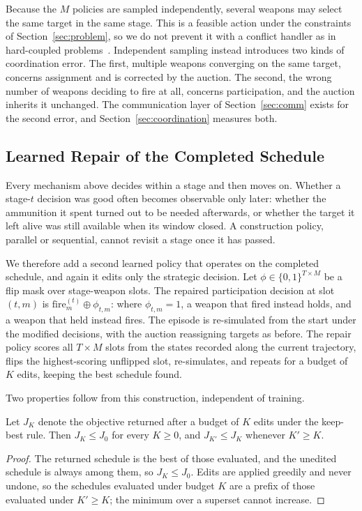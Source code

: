 Because the $M$ policies are sampled independently, several weapons may select the same target in the same stage. This is a feasible action under the constraints of Section~\ref{sec:problem}, so we do not prevent it with a conflict handler as in hard-coupled problems~\cite{parco2024}. Independent sampling instead introduces two kinds of coordination error. The first, multiple weapons converging on the same target, concerns assignment and is corrected by the auction. The second, the wrong number of weapons deciding to fire at all, concerns participation, and the auction inherits it unchanged. The communication layer of Section~\ref{sec:comm} exists for the second error, and Section~\ref{sec:coordination} measures both.

\subsection{Learned Repair of the Completed Schedule}
\label{sec:repair}

Every mechanism above decides within a stage and then moves on. Whether a stage-$t$ decision was good often becomes observable only later: whether the ammunition it spent turned out to be needed afterwards, or whether the target it left alive was still available when its window closed. A construction policy, parallel or sequential, cannot revisit a stage once it has passed.

We therefore add a second learned policy that operates on the completed schedule, and again it edits only the strategic decision. Let $\phi \in \{0,1\}^{T\times M}$ be a flip mask over stage-weapon slots. The repaired participation decision at slot $(t,m)$ is $\text{fire}_m^{(t)} \oplus \phi_{t,m}$: where $\phi_{t,m}=1$, a weapon that fired instead holds, and a weapon that held instead fires. The episode is re-simulated from the start under the modified decisions, with the auction reassigning targets as before. The repair policy scores all $T\times M$ slots from the states recorded along the current trajectory, flips the highest-scoring unflipped slot, re-simulates, and repeats for a budget of $K$ edits, keeping the best schedule found.

Two properties follow from this construction, independent of training.

\begin{proposition}
\label{prop:repair-monotone}
Let $J_K$ denote the objective returned after a budget of $K$ edits under the keep-best rule. Then $J_K \leq J_0$ for every $K \geq 0$, and $J_{K'} \leq J_K$ whenever $K' \geq K$.
\end{proposition}
\begin{proof}
The returned schedule is the best of those evaluated, and the unedited schedule is always among them, so $J_K \leq J_0$. Edits are applied greedily and never undone, so the schedules evaluated under budget $K$ are a prefix of those evaluated under $K' \geq K$; the minimum over a superset cannot increase.
\end{proof}

